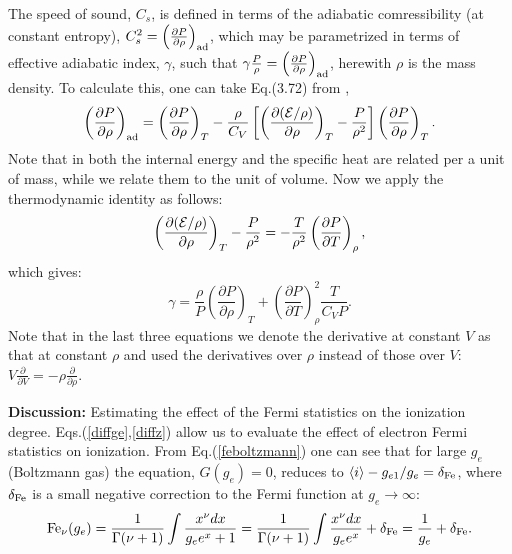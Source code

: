 The speed of sound, $C_s$, is defined in terms of the adiabatic comressibility (at constant entropy), $C_s^2=\left(\frac{\partial P}{\partial \rho}\right)_{\rm ad}$, which
may be parametrized in terms of effective adiabatic index, $\gamma$, such that 
$\gamma\frac{P}\rho=\left(\frac{\partial P}{\partial \rho}\right)_{\rm ad}$, herewith $\rho$ is the mass density. To calculate this, one can take Eq.(3.72) from 
\cite{drake}, 
$$
\left(\frac{\partial P}{\partial \rho}\right)_{\rm ad}=\left(\frac{\partial P}{\partial \rho}\right)_T-
\frac{\rho}{C_V}\left[
\left( \frac{\partial({\cal E}/\rho)}{\partial \rho}\right)_T-\frac{P}{\rho^2}\right]\left(\frac{\partial P}{\partial \rho}\right)_T.
$$
Note that in \cite{drake} both the internal energy and the specific heat are related per a unit of mass, while we relate them to the unit of volume.  
Now we apply the thermodynamic identity as follows:
\begin{equation}
\left( \frac{\partial ({\cal E}/\rho)}{\partial \rho} \right)_{T} - \frac{P}{\rho^2} =
-\frac{T}{\rho^2} \left( \frac{\partial P}{\partial T} \right)_{\rho},
\end{equation}
which gives:
\begin{equation}
\gamma = \frac{\rho}{P} \left( \frac{\partial P}{\partial \rho} \right)_T +
\left( \frac{\partial P}{\partial T} \right)^2_\rho \frac{T}{C_V P}.
\end{equation}
Note that in the last three equations we denote the derivative at constant $V$ as that at constant $\rho$ and used the derivatives over $\rho$ instead of those over $V$:
 $V\frac\partial{\partial V}=-\rho\frac\partial{\partial \rho}$.

{\bf Discussion:} Estimating the effect of the Fermi statistics on the ionization degree.
Eqs.(\ref{diffge},\ref{diffz}) allow us to evaluate the effect of electron Fermi statistics on ionization.
From Eq.(\ref{feboltzmann}) one can
see that for large $g_e$ (Boltzmann gas) the equation, $G(g_e)=0$, reduces to $\langle i\rangle-g_{e1}/g_e=\delta_{\rm Fe}$,
where $\delta_{\rm Fe}$ is a small negative correction to the Fermi function at $g_e \to \infty$:
\begin{equation}\label{feboltzmann}
{\rm Fe}_\nu(g_e)=\frac{1}{\Gamma(\nu+1)} \int \frac{x^\nu dx}{g_e e^x + 1} =
\frac{1}{\Gamma(\nu+1)} \int \frac{x^\nu dx}{g_e e^x} + \delta_{\rm Fe} = \frac{1}{g_e} + \delta_{\rm Fe}.
\end{equation}

